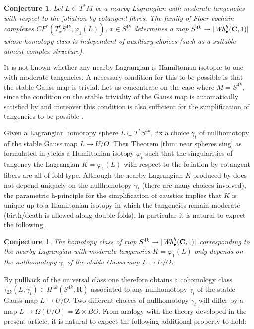 \documentclass{amsart}
\def\bC{\mathbf{C}}
\def\bR{\mathbf{R}}
\def\bZ{\mathbf{Z}}
\newtheorem{conjecture}[theorem]{Conjecture}
\theoremstyle{definition}
\theoremstyle{remark}
\newtheorem{inductive lemma}[theorem]{Inductive Lemma}
\begin{document}
\begin{conjecture}
Let $L \subset T^*M$ be a nearby Lagrangian with moderate tangencies with respect to the foliation by cotangent fibres. The family of Floer cochain complexes $CF^*(T^*_xS^{4k},\varphi_1(L))$, $x \in S^{4k}$ determines a map $S^{4k} \to  |\text{\em Wh}_\bullet^h(\bC,1)|$ whose homotopy class is independent of auxiliary choices (such as a suitable almost complex structure). 
\end{conjecture}

It is not known whether any nearby Lagrangian is Hamiltonian isotopic to one with moderate tangencies. A necessary condition for this to be possible is that the stable Gauss map is trivial. Let us concentrate on the case where $M=S^{4k}$, since the condition on the stable triviality of the Gauss map is automatically satisfied by \cite{ACGK} and moreover this condition is also sufficient for the simplification of tangencies to be possible \cite{AD22}. 

Given a Lagrangian homotopy sphere $L \subset T^*S^{4k}$, fix a choice $\gamma_t$ of nullhomotopy of the stable Gauss map $L \to U/O$. Then Theorem \ref{thm: near spheres sing} as formulated in \cite{AD22} yields a Hamiltonian isotopy $\varphi_t$ such that the singularities of tangency the Lagrangian $K=\varphi_1(L)$ with respect to the foliation by cotangent fibers are all of fold type. Although the nearby Lagrangian $K$ produced by \cite{AD22} does not depend uniquely on the nullhomotopy $\gamma_t$ (there are many choices involved), the parametric h-principle for the simplification of caustics \cite{AG18a,AG18b} implies that $K$ is unique up to a Hamiltonian isotopy in which the tangencies remain moderate (birth/death is allowed along double folds). In particular it is natural to expect the following.

\begin{conjecture} The homotopy class of map $S^{4k} \to  |\text{\em Wh}_\bullet^h(\bC,1)|$ corresponding to the nearby Lagrangian with moderate tangencies $K=\varphi_1(L)$ only depends on the nullhomotopy $\gamma_t$ of the stable Gauss map $L \to U/O$.
\end{conjecture}

By pullback of the universal class one therefore obtains a cohomology class $\tau_{2k}(L,\gamma_t) \in H^{4k}(S^{4k},\bR)$ associated to any nullhomotopy $\gamma_t$ of the stable Gauss map $L \to U/O$. Two different choices of nullhomotopy $\gamma_t$ will differ by a map $L \to \Omega (U/O) = \bZ \times BO$. From analogy with the theory developed in the present article, it is natural to expect the following additional property to hold:
\end{document}
